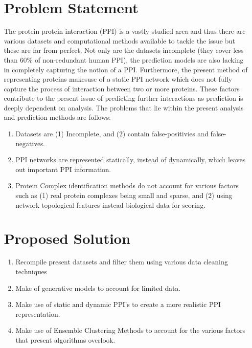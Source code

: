 

\section{Problem Statement}

The protein-protein interaction (PPI) is a vastly studied area and thus there are various datasets and computational methods available to tackle the issue but these are far from perfect. 
Not only are the datasets incomplete (they cover less than 60\% of non-redundant 
human PPI), the prediction models are also lacking in completely capturing the 
notion of a PPI. Furthermore, the present method of representing proteins makesuse
of a static PPI network which does not fully capture the process of interaction 
between two or more proteins. These factors contribute to the present issue of 
predicting further interactions as prediction is deeply dependent on analysis. 
The problems that lie within the present analysis and prediction methods are follows:
    
    \begin{enumerate}
        \item Datasets are (1) Incomplete, and (2) contain false-positivies and false-negatives.
        \item PPI networks are represented statically, instead of dynamically, which leaves out important PPI information.
        \item Protein Complex identification methods do not account for various factors such as (1) real protein complexes being small and sparse, and (2) using network topological features instead biological data for scoring. 
    \end{enumerate}
    
\section{Proposed Solution}

    \begin{enumerate}
        \item Recompile present datasets and filter them using various data cleaning techniques
        \item Make of generative models to account for limited data.
        \item Make use of static and dynamic PPI's to create a more realistic PPI representation.
        \item Make use of Ensemble Clustering Methods to account for the various factors that present algorithms overlook.
    \end{enumerate}
    
